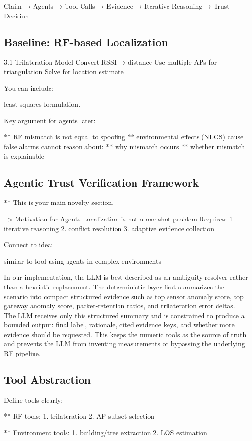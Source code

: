 \documentclass[10pt, twocolumn, letterpaper]{article}
\begin{document}
Claim → Agents → Tool Calls → Evidence → Iterative Reasoning → Trust Decision

\subsection{Baseline: RF-based Localization}
3.1 Trilateration Model
Convert RSSI → distance
Use multiple APs for triangulation
Solve for location estimate

You can include:

least squares formulation. 


Key argument for agents later:

** RF mismatch is not equal to spoofing
** environmental effects (NLOS) cause false alarms
cannot reason about:
** why mismatch occurs
** whether mismatch is explainable
\subsection{Agentic Trust Verification Framework}

** This is your main novelty section.

--> Motivation for Agents
Localization is not a one-shot problem
Requires:
1. iterative reasoning
2. conflict resolution
3. adaptive evidence collection

Connect to idea:

similar to tool-using agents in complex environments

In our implementation, the LLM is best described as an ambiguity resolver rather than a heuristic replacement. The deterministic layer first summarizes the scenario into compact structured evidence such as top sensor anomaly score, top gateway anomaly score, packet-retention ratios, and trilateration error deltas. The LLM receives only this structured summary and is constrained to produce a bounded output: final label, rationale, cited evidence keys, and whether more evidence should be requested. This keeps the numeric tools as the source of truth and prevents the LLM from inventing measurements or bypassing the underlying RF pipeline.


\subsection{Tool Abstraction}

Define tools clearly:

** RF tools:
1. trilateration
2. AP subset selection


** Environment tools:
1. building/tree extraction
2. LOS estimation
\end{document}
